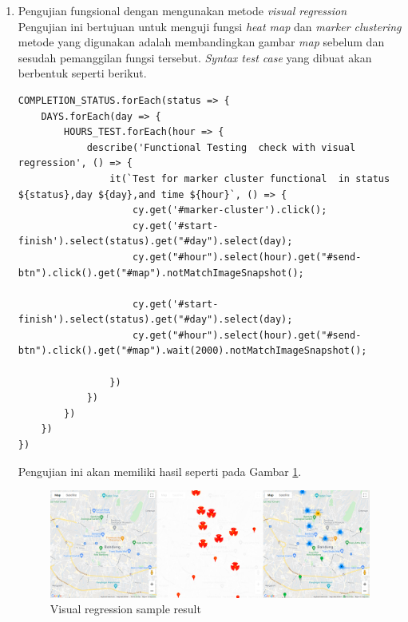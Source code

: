 \begin{enumerate}
    \item Pengujian fungsional dengan mengunakan metode \textit{visual regression} \\
    Pengujian ini bertujuan untuk menguji fungsi \textit{heat map} dan \textit{marker clustering} metode yang digunakan adalah membandingkan gambar \textit{map} sebelum dan sesudah pemanggilan fungsi tersebut. \textit{Syntax test case} yang dibuat akan berbentuk seperti berikut.\\
    \begin{lstlisting}[label=functional_test_case_visual , caption=Funcional Test Case Visual Regression]
COMPLETION_STATUS.forEach(status => {
    DAYS.forEach(day => {
        HOURS_TEST.forEach(hour => {
            describe('Functional Testing  check with visual regression', () => {
                it(`Test for marker cluster functional  in status ${status},day ${day},and time ${hour}`, () => {
                    cy.get('#marker-cluster').click();
                    cy.get('#start-finish').select(status).get("#day").select(day);
                    cy.get("#hour").select(hour).get("#send-btn").click().get("#map").notMatchImageSnapshot();

                    cy.get('#start-finish').select(status).get("#day").select(day);
                    cy.get("#hour").select(hour).get("#send-btn").click().get("#map").wait(2000).notMatchImageSnapshot();

                })
            })
        })
    })
})
    \end{lstlisting}
    Pengujian ini akan memiliki hasil seperti pada Gambar \ref{fig:visualRegressionState}.
    \begin{figure}[H]
	\centering  
	\includegraphics[scale=0.2]{Gambar/Visual_Regression_Sample_Method.png}  
	\caption[Visual regression sample result]{Visual regression sample result} 
	\label{fig:visualRegressionState}
	\end{figure}
	

\end{enumerate}
